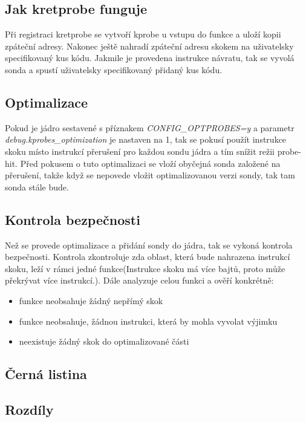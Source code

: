 \subsection*{Jak kretprobe funguje}

Při registraci kretprobe se vytvoří kprobe u vstupu do funkce a uloží kopii zpáteční adresy. Nakonec ještě nahradí zpáteční adresu skokem na uživatelsky specifikovaný kus kódu. Jakmile je provedena instrukce návratu, tak se vyvolá sonda a spustí uživatelsky specifikovaný přidaný kus kódu.

\subsection{Optimalizace}

Pokud je jádro sestavené s příznakem \emph{CONFIG\_OPTPROBES=y} a parametr \emph{debug.kprobes\_optimization} je nastaven na 1, tak se pokusí použít instrukce skoku místo instrukcí přerušení pro každou sondu jádra a tím snížit režii probe-hit. Před pokusem o tuto optimalizaci se vloží obyčejná sonda založené na přerušení, takže když se nepovede vložit optimalizovanou verzi sondy, tak tam sonda stále bude.

\subsection{Kontrola bezpečnosti}

Než se provede optimalizace a přidání sondy do jádra, tak se vykoná kontrola bezpečnosti. Kontrola zkontroluje zda oblast, která bude nahrazena instrukcí skoku, leží v rámci jedné funkce(Instrukce skoku má více bajtů, proto může překrývat více instrukcí.). Dále analyzuje celou funkci a ověří konkrétně:

\begin{itemize}[noitemsep]
    \item{funkce neobsahuje žádný nepřímý skok}
    \item{funkce neobsahuje, žádnou instrukci, která by mohla vyvolat výjimku}
    \item{neexistuje žádný skok do optimalizované části}
\end{itemize}

\iffalse
\subsection*{Černá listina}
\subsection*{Rozdíly}

